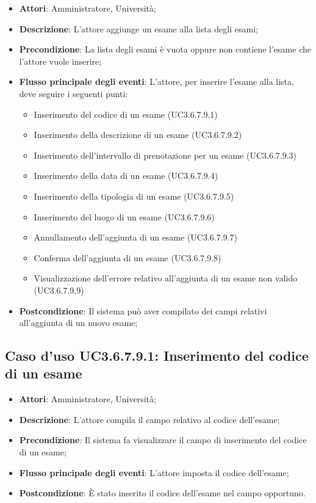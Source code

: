 \begin{itemize}
\item \textbf{Attori}: Amministratore, Università;
\item \textbf{Descrizione}: L'attore aggiunge un esame alla lista degli esami;

\item \textbf{Precondizione}: La lista degli esami è vuota oppure non contiene l'esame che l'attore vuole inserire;

\item \textbf{Flusso principale degli eventi}: L'attore, per inserire l'esame alla lista, deve seguire i seguenti punti:

\begin{itemize}
\item Inserimento del codice di un esame (UC3.6.7.9.1)
\item Inserimento della descrizione di un esame (UC3.6.7.9.2)
\item Inserimento dell’intervallo di prenotazione per un esame (UC3.6.7.9.3)
\item Inserimento della data di un esame (UC3.6.7.9.4)
\item Inserimento della tipologia di un esame (UC3.6.7.9.5)
\item Inserimento del luogo di un esame (UC3.6.7.9.6)
\item Annullamento dell’aggiunta di un esame (UC3.6.7.9.7)
\item Conferma dell’aggiunta di un esame (UC3.6.7.9.8)
\item Visualizzazione dell'errore relativo all’aggiunta di un esame non valido (UC3.6.7.9.9)
\end{itemize}
\item \textbf{Postcondizione}: Il sistema può aver compilato dei campi relativi all'aggiunta di un nuovo esame;

\end{itemize}
\subsection{Caso d'uso \texorpdfstring{UC3.6.7.9.1}{UC3.6.7.9.1}: Inserimento del codice di un esame}
\begin{itemize}
\item \textbf{Attori}: Amministratore, Università;
\item \textbf{Descrizione}: L'attore compila il campo relativo al codice dell’esame;

\item \textbf{Precondizione}: Il sistema fa visualizzare il campo di inserimento del codice di un esame;
\item \textbf{Flusso principale degli eventi}: L'attore imposta il codice dell’esame;

\item \textbf{Postcondizione}: È stato inserito il codice dell'esame nel campo opportuno.
\end{itemize}
